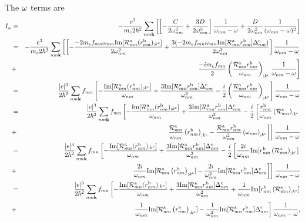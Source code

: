 \documentclass[floatfix,prb,aps,superscriptaddress,11pt,preprint]{revtex4}
\begin{document}
The $\omega$ terms are
\begin{eqnarray}\label{pfia}
I_{\omega}
&=&
-\frac{e^3}{m_e2\hbar^2}
\sum_{nm\mathbf{k}}
\left[
\left[
-\frac{C}{2\omega^2_{nm}}
+
\frac{3D}{2\omega^3_{nm}}
\right]\frac{1}{\omega_{nm}-\omega}
+
\frac{D}{2\omega^2_{nm}}\frac{1}{(\omega_{nm}-\omega)^2}
\right]
\nonumber\\
&=&
-\frac{e^3}{m_e2\hbar^2}
\sum_{nm\mathbf{k}}
\left[
\left[
-\frac{-2m_ef_{mn}\omega_{mn}\mathrm{Im}[{\cal R}^{\mathrm{a}}_{mn}(r^{\mathrm{b}}_{nm})_{;k^{\mathrm{c}}}]
}{2\omega^2_{nm}}
+
\frac{3(-2m_ef_{mn}\omega_{mn}\mathrm{Im}[{\cal R}^{\mathrm{a}}_{mn}r^{\mathrm{b}}_{nm}]\Delta^{\mathrm{c}}_{nm})}{2\omega^3_{nm}}
\right]\frac{1}{\omega_{nm}-\omega}
\right.
\nonumber\\
&+&
\left.
\frac{-im_ef_{mn}}{2}
\left(
\frac{{\cal R}^{\mathrm{a}}_{mn}r^{\mathrm{b}}_{nm}}{\omega_{nm}}
\right)_{;k^{\mathrm{c}}}
\frac{1}{\omega_{nm}-\omega}
\right]
\nonumber\\
&=&
\frac{|e|^3}{2\hbar^2}
\sum_{nm\mathbf{k}}
f_{mn}
\left[
-\frac{\mathrm{Im}[{\cal R}^{\mathrm{a}}_{mn}(r^{\mathrm{b}}_{nm})_{;k^{\mathrm{c}}}]
}{\omega_{nm}}
+
\frac{3\mathrm{Im}[{\cal R}^{\mathrm{a}}_{mn}r^{\mathrm{b}}_{nm}]\Delta^{\mathrm{c}}_{nm}}{\omega^2_{nm}}
-
\frac{i}{2}
\left(
\frac{{\cal R}^{\mathrm{a}}_{mn}r^{\mathrm{b}}_{nm}}{\omega_{nm}}
\right)_{;k^{\mathrm{c}}}
\right]\frac{1}{\omega_{nm}-\omega}
\nonumber\\
&=&
\frac{|e|^3}{2\hbar^2}
\sum_{nm\mathbf{k}}
f_{mn}
\left[
-\frac{\mathrm{Im}[{\cal R}^{\mathrm{a}}_{mn}(r^{\mathrm{b}}_{nm})_{;k^{\mathrm{c}}}]
}{\omega_{nm}}
+
\frac{3\mathrm{Im}[{\cal R}^{\mathrm{a}}_{mn}r^{\mathrm{b}}_{nm}]\Delta^{\mathrm{c}}_{nm}}{\omega^2_{nm}}
-
\frac{i}{2}
\left[
\frac{r^{\mathrm{b}}_{nm}}{\omega_{nm}}
\left(
{\cal R}^{\mathrm{a}}_{mn}
\right)_{;k^{\mathrm{c}}}
\right.
\right.
\nonumber\\
&+&
\left.
\left.
\frac{{\cal R}^{\mathrm{a}}_{mn}}{\omega_{nm}}
\left(
r^{\mathrm{b}}_{nm}
\right)_{;k^{\mathrm{c}}}
-
\frac{{\cal R}^{\mathrm{a}}_{mn}r^{\mathrm{b}}_{nm}}{\omega^2_{nm}}
\left(
\omega_{nm}
\right)_{;k^{\mathrm{c}}}
\right]
\right]
\frac{1}{\omega_{nm}-\omega}
\nonumber\\
&=&
\frac{|e|^3}{2\hbar^2}
\sum_{nm\mathbf{k}}
f_{mn}
\left[
-\frac{\mathrm{Im}[{\cal R}^{\mathrm{a}}_{mn}(r^{\mathrm{b}}_{nm})_{;k^{\mathrm{c}}}]
}{\omega_{nm}}
+
\frac{3\mathrm{Im}[{\cal R}^{\mathrm{a}}_{mn}r^{\mathrm{b}}_{nm}]\Delta^{\mathrm{c}}_{nm}}{\omega^2_{nm}}
-
\frac{i}{2}
\left[
\frac{2i}{\omega_{nm}}
\mathrm{Im}[r^{\mathrm{b}}_{nm}\left({\cal R}^{\mathrm{a}}_{mn}\right)_{;k^{\mathrm{c}}}]
\right.
\right.
\nonumber\\
&+&
\left.
\left.
\frac{2i}{\omega_{nm}}
\mathrm{Im}[
{\cal R}^{\mathrm{a}}_{mn}
\left(
r^{\mathrm{b}}_{nm}
\right)_{;k^{\mathrm{c}}}
]
-
\frac{2i}{\omega^2_{nm}}
\mathrm{Im}[{\cal R}^{\mathrm{a}}_{mn}r^{\mathrm{b}}_{nm}]
\Delta^{\mathrm{c}}_{nm}
\right]
\right]
\frac{1}{\omega_{nm}-\omega}
\nonumber\\
&=&
\frac{|e|^3}{2\hbar^2}
\sum_{nm\mathbf{k}}
f_{mn}
\left[
-\frac{\mathrm{Im}[{\cal R}^{\mathrm{a}}_{mn}(r^{\mathrm{b}}_{nm})_{;k^{\mathrm{c}}}]
}{\omega_{nm}}
+
\frac{3\mathrm{Im}[{\cal R}^{\mathrm{a}}_{mn}r^{\mathrm{b}}_{nm}]\Delta^{\mathrm{c}}_{nm}}{\omega^2_{nm}}
+
\frac{1}{\omega_{nm}}
\mathrm{Im}[r^{\mathrm{b}}_{nm}\left({\cal R}^{\mathrm{a}}_{mn}\right)_{;k^{\mathrm{c}}}]
\right.
\nonumber\\
&+&
\left.
\frac{1}{\omega_{nm}}
\mathrm{Im}[
{\cal R}^{\mathrm{a}}_{mn}
\left(
r^{\mathrm{b}}_{nm}
\right)_{;k^{\mathrm{c}}}
]
-
\frac{1}{\omega^2_{nm}}
\mathrm{Im}[{\cal R}^{\mathrm{a}}_{mn}r^{\mathrm{b}}_{nm}]
\Delta^{\mathrm{c}}_{nm}
\right]
\frac{1}{\omega_{nm}-\omega}
,
\end{eqnarray}
\end{document}
